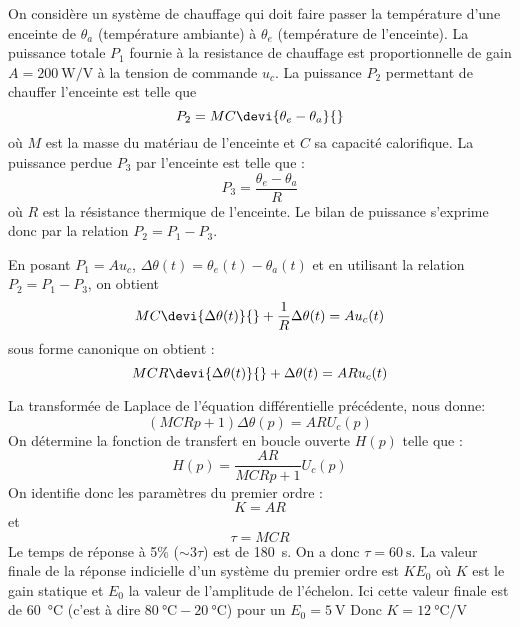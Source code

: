On considère un système de chauffage qui doit faire passer la température 
d'une enceinte de $\theta_a$  (température ambiante) à $\theta_e$ (température 
de l'enceinte). 
La puissance totale $P_1$ fournie à la resistance de chauffage 
est proportionnelle de gain $A=\SI{200}{\watt\per\volt}$ à la tension de 
commande $u_c$. La puissance $P_2$ permettant de chauffer l'enceinte est 
telle que 
\[
    P_2=MC\devi{\theta_e-\theta_a}{}
\]
où $M$ est la masse du matériau de l'enceinte et $C$ sa capacité calorifique.
La puissance perdue $P_3$ par l'enceinte est telle que :
\[
    P_3=\dfrac{\theta_e-\theta_a}{R}
\]
où $R$ est la résistance thermique de l'enceinte.
Le bilan de puissance s'exprime donc par la relation $P_2=P_1-P_3$.

\question{}
En posant $P_1=Au_c$, $\Delta\theta(t)=\theta_e(t)-\theta_a(t)$ et en utilisant
la relation $P_2=P_1-P_3$, on obtient 
\[
    MC\devi{\Delta\theta(t)}{}+\dfrac{1}{R}\Delta\theta(t)=Au_c(t)
\]
sous forme canonique on obtient :
\[
    MCR\devi{\Delta\theta(t)}{}+\Delta\theta(t)=ARu_c(t)
\]

\question{}
La transformée de Laplace de l'équation différentielle précédente, nous donne:
\[
    (MCRp+1)\Delta\theta(p)=AR U_c(p)
\]
On détermine la fonction de transfert en boucle ouverte $H(p)$ telle que :
\[
    H(p)=\dfrac{AR}{MCRp+1} U_c(p)
\]
On identifie donc les paramètres du premier ordre :
\[
    K=AR
\]
et
\[
    \tau=MCR
\]
\question{}
Le temps de réponse à 5\% ($\sim 3\tau$) est de \SI{180}{\second}. 
On a donc $\tau=\SI{60}{\second}$. 
La valeur finale de la réponse indicielle d'un système du premier ordre est 
$KE_0$ où $K$ est le gain statique et $E_0$ la valeur de l'amplitude de 
l'échelon. Ici cette valeur finale est de \SI{60}{\celsius} (c'est à dire 
$\SI{80}{\celsius} -\SI{20}{\celsius}$) pour un $E_0=\SI{5}{\volt}$
Donc $K=\SI{12}{\celsius\per\volt}$

